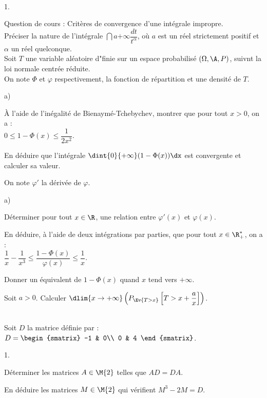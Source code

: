\documentclass[11pt]{article}%
\begin{document}
\begin{exerciceAP}~
  \begin{noliste}{1.}
    \setlength{\itemsep}{2mm}
  \item Question de cours : Critères de convergence d'une intégrale
    impropre.\\
    Préciser la nature de l'intégrale $\dint{a}{+\infty}
    \dfrac{dt}{t^\alpha}$, où $a$ est un réel strictement positif et
    $\alpha$ un réel quelconque.\\
    Soit $T$ une variable aléatoire d"finie sur un espace probabilisé
    $(\Omega,\A,P)$, suivnt la loi normale centrée réduite.\\
    On note $\Phi$ et $\varphi$ respectivement, la fonction de
    répartition et une densité de $T$.
  \item
    \begin{noliste}{a)}
    \setlength{\itemsep}{2mm}
    \item \`A l'aide de l'inégalité de Bienaymé-Tchebychev, montrer
      que pour tout $x>0$, on a :\\ $0\leq 1-\Phi(x)\leq
      \dfrac{1}{2x^2}$.
    \item En déduire que l'intégrale $\dint{0}{+\infty}
      (1-\Phi(x))\dx$ est convergente et calculer sa valeur.
    \end{noliste}

  \item On note $\varphi'$ la dérivée de $\varphi$.
    \begin{noliste}{a)}
    \setlength{\itemsep}{2mm}
    \item Déterminer pour tout $x\in\R$, une relation entre
      $\varphi'(x)$ et $\varphi(x)$.
    \item En déduire, à l'aide de deux intégrations par parties, que
      pour tout $x\in\R_+^*$, on a :\\
      $\dfrac{1}{x}-\dfrac{1}{x^3}\leq
      \dfrac{1-\Phi(x)}{\varphi(x)}\leq \dfrac{1}{x}$.
    \item Donner un équivalent de $1-\Phi(x)$ quand $x$ tend vers
      $+\infty$.
    \end{noliste}

  \item Soit $a>0$. Calculer $\dlim{x\to+\infty} \left(
      P_{\Ev{T>x}}\left[T>x+\dfrac{a}{x}\right]\right)$.
  \end{noliste}
\end{exerciceAP}


\begin{exerciceSP}~\\
  Soit $D$ la matrice définie par : $D = 
  \begin{smatrix} 
    -1 & 0\\ 
    0 & 4
  \end{smatrix}$.
  \begin{noliste}{1.}
    \setlength{\itemsep}{2mm}
  \item Déterminer les matrices $A\in\M{2}$ telles que $AD=DA$.
  \item En déduire les matrices $M\in\M{2}$ qui vérifient $M^3-2M=D$.
  \end{noliste}
\end{exerciceSP}
\end{document}
